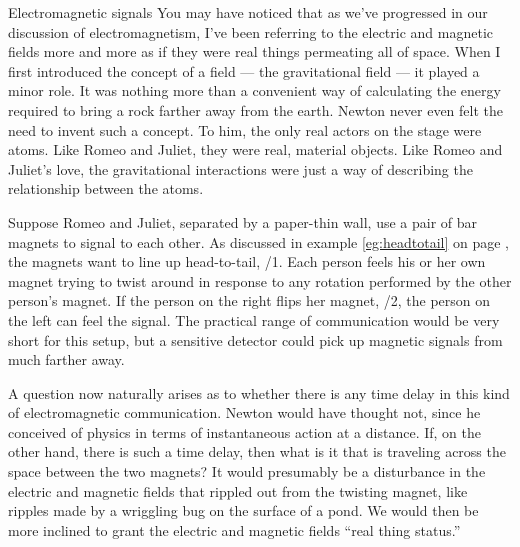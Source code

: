 %
\begin{envsubsection}{Electromagnetic signals}
You may have noticed that as we've progressed in our discussion of electromagnetism,
I've been referring to the electric and magnetic fields more and more as if they
were real things permeating all of space. When I first introduced the concept of
a field --- the gravitational field --- it played a minor role. It was nothing more
than a convenient way of calculating the energy required to bring a rock farther away
from the earth. Newton never even felt the need to invent such a concept. To him, the
only real actors on the stage were atoms. Like Romeo and Juliet, they were real,
material objects. Like Romeo and Juliet's love, the gravitational interactions
were just a way of describing the relationship between the atoms.

Suppose Romeo and Juliet,
separated by a paper-thin wall, use a pair of
bar magnets to signal to each other. As discussed in example 
\ref{eg:headtotail} on page \pageref{eg:headtotail}, the magnets want to line up head-to-tail,
/1. Each person feels
his or her own magnet trying to twist around in response to any
rotation performed by the other person's magnet. If the person
on the right flips her magnet, /2, the person
on the left can feel the signal. The
practical range of communication would be very short for
this setup, but a sensitive detector could pick
up magnetic signals from much farther away. 

A question now naturally arises as to whether there is any
time delay in this kind of electromagnetic communication.
Newton would have thought not, since he
conceived of physics in terms of instantaneous action at a
distance. If, on the other hand, there is such a time delay,
then what is it that is traveling across the space between the
two magnets? It would presumably be a disturbance in the electric
and magnetic fields that rippled out from the twisting magnet, like
ripples made by a wriggling bug on the surface of a pond. We would
then be more inclined to grant the electric and magnetic fields ``real thing
status.''


\end{envsubsection}
